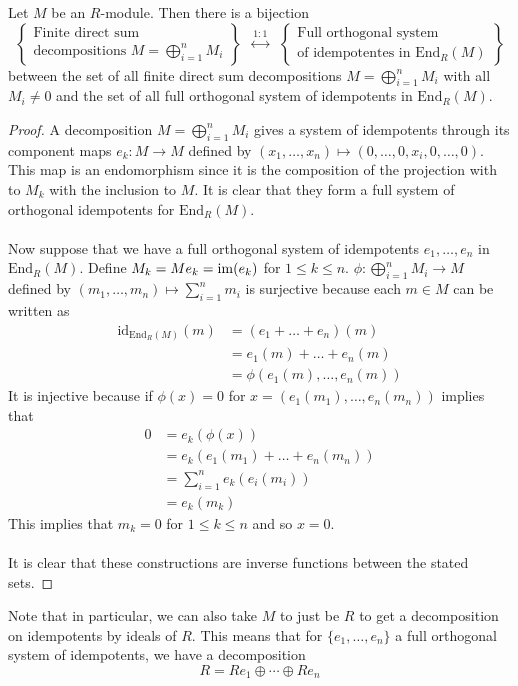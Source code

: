 \documentclass[a4paper]{article}
\begin{document}
\begin{prp}{}{} Let $M$ be an $R$-module. Then there is a bijection $$\left\{\substack{\text{Finite direct sum}\\\text{decompositions }M=\bigoplus_{i=1}^n M_i}\right\}\;\;\overset{1:1}{\longleftrightarrow}\;\;\left\{\substack{\text{Full orthogonal system}\\\text{of idempotentes in }\text{End}_R(M)}\right\}$$ between the set of all finite direct sum decompositions $M=\bigoplus_{i=1}^n M_i$ with all $M_i\neq 0$ and the set of all full orthogonal system of idempotents in $\text{End}_R(M)$. \tcbline
\begin{proof}
A decomposition $M=\bigoplus_{i=1}^nM_i$ gives a system of idempotents through its component maps $e_k:M\to M$ defined by $(x_1,\dots,x_n)\mapsto(0,\dots,0,x_i,0,\dots,0)$. This map is an endomorphism since it is the composition of the projection with to $M_k$ with the inclusion to $M$. It is clear that they form a full system of orthogonal idempotents for $\text{End}_R(M)$. \\~\\

Now suppose that we have a full orthogonal system of idempotents $e_1,\dots,e_n$ in $\text{End}_R(M)$. Define $M_k=Me_k=\operatorname{im}(e_k)$ for $1\leq k\leq n$. $\phi:\bigoplus_{i=1}^nM_i\to M$ defined by $(m_1,\dots,m_n)\mapsto\sum_{i=1}^nm_i$ is surjective because each $m\in M$ can be written as 
\begin{align*}
\text{id}_{\text{End}_R(M)}(m)&=(e_1+\dots+e_n)(m)\\
&=e_1(m)+\dots+e_n(m)\\
&=\phi(e_1(m),\dots,e_n(m))
\end{align*}
It is injective because if $\phi(x)=0$ for $x=(e_1(m_1),\dots,e_n(m_n))$ implies that 
\begin{align*}
0&=e_k(\phi(x))\\
&=e_k(e_1(m_1)+\dots+e_n(m_n))\\
&=\sum_{i=1}^ne_k(e_i(m_i))\\
&=e_k(m_k)
\end{align*}
This implies that $m_k=0$ for $1\leq k\leq n$ and so $x=0$. \\~\\

It is clear that these constructions are inverse functions between the stated sets. 
\end{proof}
\end{prp}

Note that in particular, we can also take $M$ to just be $R$ to get a decomposition on idempotents by ideals of $R$. This means that for $\{e_1,\dots,e_n\}$ a full orthogonal system of idempotents, we have a decomposition $$R=Re_1\oplus\cdots\oplus Re_n$$
\end{document}

